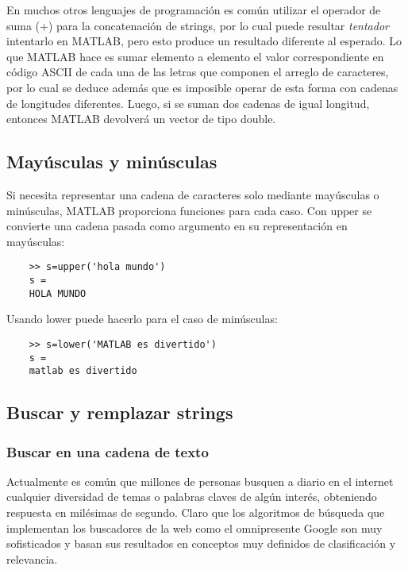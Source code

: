 \begin{tcolorbox}[title=De la concatenación]
En muchos otros lenguajes de programación es común utilizar el operador de suma (+) para la concatenación de strings, 
por lo cual puede resultar \textit{tentador} intentarlo en MATLAB, pero  esto produce un resultado diferente al esperado. 
Lo que MATLAB hace es sumar elemento a elemento el valor correspondiente en código ASCII de cada una de las letras 
que componen el arreglo de caracteres, por lo cual se deduce además que es imposible operar de esta forma con cadenas 
de longitudes diferentes. Luego, si se suman dos cadenas de igual longitud, entonces MATLAB devolverá un vector de 
tipo double.
\end{tcolorbox}


\subsection{Mayúsculas y minúsculas}

Si necesita representar una cadena de caracteres solo mediante mayúsculas o minúsculas, MATLAB 
proporciona funciones para cada caso. Con upper se convierte una cadena pasada como argumento 
en su representación en mayúsculas:

\begin{verbatim}
	>> s=upper('hola mundo')
	s =
	HOLA MUNDO
\end{verbatim}

Usando lower puede hacerlo para el caso de minúsculas:

\begin{verbatim}
	>> s=lower('MATLAB es divertido')
	s =
	matlab es divertido
\end{verbatim}

\subsection{Buscar y remplazar strings}

\subsubsection{Buscar en una cadena de texto}

Actualmente es común que millones de personas busquen a diario en el internet cualquier 
diversidad de temas o palabras claves de algún interés, obteniendo respuesta en milésimas 
de segundo. Claro que los algoritmos de búsqueda que implementan los buscadores de la web 
como el omnipresente Google son muy sofisticados y basan sus resultados en conceptos muy 
definidos de clasificación y relevancia.\\

